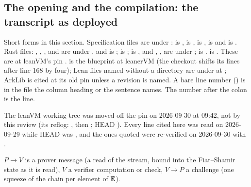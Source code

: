 \subsection{The opening and the compilation: the transcript as deployed}\label{sec:gen-opening-transcript}

\begin{sloppypar}
Short forms in this section. Specification files are under :  is
,  is ,  is
,  is  and  is
. Rust files: , ,
,  and  are under
, and  is ;  is
;  is , and
, ,  are under ;
 is .  is
. These are at leanVM's pin .  is the
blueprint  at leanerVM  (the checkout
 shifts its lines after line 168 by four); Lean files named without a directory are
under  at ; ArkLib is cited at its old pin 
unless a revision is named. A bare line number () is in the file the column heading or
the sentence names. The number after the colon is the line.
\end{sloppypar}

\begin{sloppypar}
The leanVM working tree was moved off the pin on 2026-09-30 at 09:42, not by this review (its
reflog: , then ; HEAD ). Every line cited here was read on
2026-09-29 while HEAD was , and the ones quoted were re-verified on 2026-09-30 with
.
\end{sloppypar}

$P→V$ is a prover message (a read of the stream, bound into the Fiat--Shamir state as it is read),
$V$ a verifier computation or check, $V→P$ a challenge (one squeeze of the chain per element of
$\mathbb{E}$).

